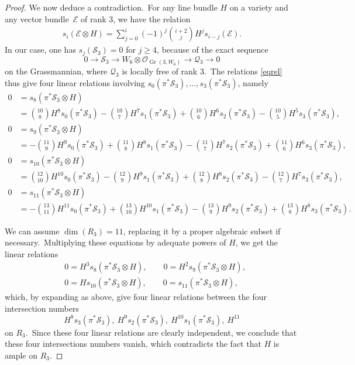 \documentclass[12pt]{amsart}
\def\cO{\mathscr{O}}
\def\cE{\mathscr{E}}
\def\cS{\mathscr{S}}
\def\cQ{\mathscr{Q}}
\DeclareMathOperator{\Gr}{Gr}
\theoremstyle{remark}
\begin{document}
\begin{proof}
We now deduce a contradiction.\
For any line bundle $H$ on a variety and any vector bundle~$\cE$ of rank $3$, we have the relation
\begin{eqnarray}\label{eqrel}
s_i(\cE\otimes H)=\sum_{j=0}^i (-1)^j \binom{i+2}{j} H^js_{i-j}(\cE).
\end{eqnarray}
In our case, one has $s_j(\cS_3)=0$ for $j\geq 4$, because of the exact sequence
\[
0\to   \cS_3\to  W_6\otimes \cO_{\Gr(3,W_6)}\to  \cQ_3\to  0
\]
on the Grassmannian, where $\cQ_3$ is locally free of rank $3$.\
The relations \eqref{eqrel}  thus give four linear relations involving  $s_0(\pi^* \cS_3),\ldots, s_3( \pi^* \cS_3)$, namely
\begin{align*}\label{eqrelexpl}
  0&=s_8(\pi^* \cS_3\otimes H  )\nonumber\\
  &= \binom{10}{8}H^8s_0(\pi^* \cS_3)-\binom{10}{7}H^7s_1(\pi^* \cS_3)+\binom{10}{6}H^6 s_2(\pi^* \cS_3)-\binom{10}{5}H^5s_3(\pi^* \cS_3),\\
  \nonumber
 0&=s_9(\pi^* \cS_3\otimes H  )\\
 &= -  \binom{11}{9}H^9s_0(\pi^* \cS_3)+\binom{11}{8}H^8s_1(\pi^* \cS_3)-\binom{11}{7}H^7s_2(\pi^* \cS_3)+\binom{11}{6}H^6s_3(\pi^* \cS_3), \\
  \nonumber
 0&=s_{10} (\pi^* \cS_3\otimes H  )\\
 &=\binom{12}{10}H^{10}s_0(\pi^* \cS_3)-\binom{12}{9}H^9s_1(\pi^* \cS_3)+\binom{12}{8}H^8s_2(\pi^* \cS_3)-\binom{12}{7}H^7s_3(\pi^* \cS_3), \\
  \nonumber
 0&=s_{11} (\pi^* \cS_3\otimes H  )\\
 &=-\binom{13}{11}H^{11}s_0(\pi^* \cS_3)+\binom{13}{10}H^{10}s_1(\pi^* \cS_3)-\binom{13}{9}H^9s_2(\pi^* \cS_3)+\binom{13}{8}H^8s_3(\pi^* \cS_3).
\end{align*}

We can assume $\dim(R_3)=11$, replacing it by a proper algebraic subset if necessary.\
Multiplying these equations by   adequate powers of $H$, we get the linear relations
\begin{equation*} 
\begin{split}
& 0=H^3s_8(\pi^* \cS_3\otimes H),\qquad 0=H^2s_9(\pi^* \cS_3\otimes H  ),\\
& 0=H s_{10} (\pi^* \cS_3\otimes H  ),\qquad 0=s_{11} (\pi^* \cS_3\otimes H),
\end{split}
\end{equation*}
which, by expanding as above,  give four linear relations between the four intersection numbers
\begin{equation*} \label{eqnumbers}
H^8s_3(\pi^* \cS_3),\ H^9s_2(\pi^* \cS_3),\ H^{10}s_1(\pi^* \cS_3), \ H^{11}
\end{equation*}
on $R_3$.\
Since these four  linear relations are clearly independent, we conclude that these four intersections numbers vanish, which contradicts the fact that $H$ is ample on $R_3$.
\end{proof}
\end{document}

